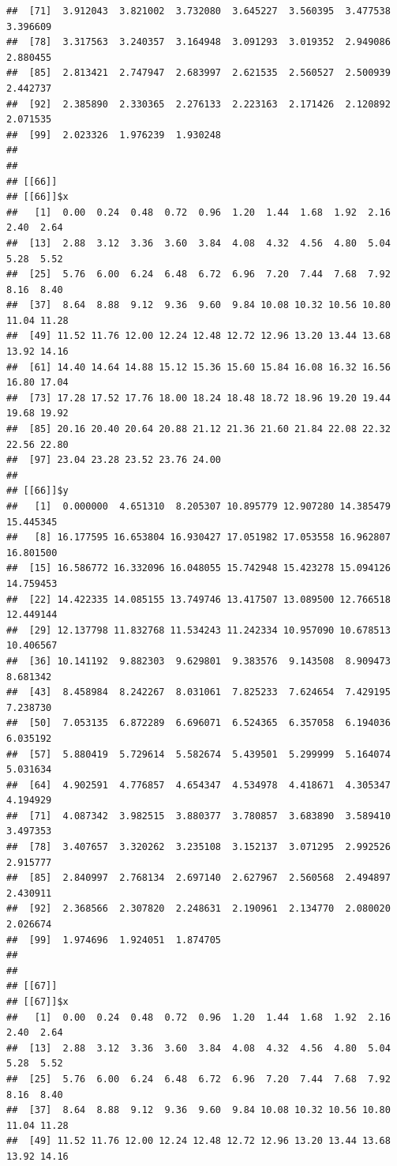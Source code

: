 \documentclass[
  ignorenonframetext,
]{beamer}
\begin{document}
\begin{frame}[fragile]{}
\begin{verbatim}
##  [71]  3.912043  3.821002  3.732080  3.645227  3.560395  3.477538  3.396609
##  [78]  3.317563  3.240357  3.164948  3.091293  3.019352  2.949086  2.880455
##  [85]  2.813421  2.747947  2.683997  2.621535  2.560527  2.500939  2.442737
##  [92]  2.385890  2.330365  2.276133  2.223163  2.171426  2.120892  2.071535
##  [99]  2.023326  1.976239  1.930248
## 
## 
## [[66]]
## [[66]]$x
##   [1]  0.00  0.24  0.48  0.72  0.96  1.20  1.44  1.68  1.92  2.16  2.40  2.64
##  [13]  2.88  3.12  3.36  3.60  3.84  4.08  4.32  4.56  4.80  5.04  5.28  5.52
##  [25]  5.76  6.00  6.24  6.48  6.72  6.96  7.20  7.44  7.68  7.92  8.16  8.40
##  [37]  8.64  8.88  9.12  9.36  9.60  9.84 10.08 10.32 10.56 10.80 11.04 11.28
##  [49] 11.52 11.76 12.00 12.24 12.48 12.72 12.96 13.20 13.44 13.68 13.92 14.16
##  [61] 14.40 14.64 14.88 15.12 15.36 15.60 15.84 16.08 16.32 16.56 16.80 17.04
##  [73] 17.28 17.52 17.76 18.00 18.24 18.48 18.72 18.96 19.20 19.44 19.68 19.92
##  [85] 20.16 20.40 20.64 20.88 21.12 21.36 21.60 21.84 22.08 22.32 22.56 22.80
##  [97] 23.04 23.28 23.52 23.76 24.00
## 
## [[66]]$y
##   [1]  0.000000  4.651310  8.205307 10.895779 12.907280 14.385479 15.445345
##   [8] 16.177595 16.653804 16.930427 17.051982 17.053558 16.962807 16.801500
##  [15] 16.586772 16.332096 16.048055 15.742948 15.423278 15.094126 14.759453
##  [22] 14.422335 14.085155 13.749746 13.417507 13.089500 12.766518 12.449144
##  [29] 12.137798 11.832768 11.534243 11.242334 10.957090 10.678513 10.406567
##  [36] 10.141192  9.882303  9.629801  9.383576  9.143508  8.909473  8.681342
##  [43]  8.458984  8.242267  8.031061  7.825233  7.624654  7.429195  7.238730
##  [50]  7.053135  6.872289  6.696071  6.524365  6.357058  6.194036  6.035192
##  [57]  5.880419  5.729614  5.582674  5.439501  5.299999  5.164074  5.031634
##  [64]  4.902591  4.776857  4.654347  4.534978  4.418671  4.305347  4.194929
##  [71]  4.087342  3.982515  3.880377  3.780857  3.683890  3.589410  3.497353
##  [78]  3.407657  3.320262  3.235108  3.152137  3.071295  2.992526  2.915777
##  [85]  2.840997  2.768134  2.697140  2.627967  2.560568  2.494897  2.430911
##  [92]  2.368566  2.307820  2.248631  2.190961  2.134770  2.080020  2.026674
##  [99]  1.974696  1.924051  1.874705
## 
## 
## [[67]]
## [[67]]$x
##   [1]  0.00  0.24  0.48  0.72  0.96  1.20  1.44  1.68  1.92  2.16  2.40  2.64
##  [13]  2.88  3.12  3.36  3.60  3.84  4.08  4.32  4.56  4.80  5.04  5.28  5.52
##  [25]  5.76  6.00  6.24  6.48  6.72  6.96  7.20  7.44  7.68  7.92  8.16  8.40
##  [37]  8.64  8.88  9.12  9.36  9.60  9.84 10.08 10.32 10.56 10.80 11.04 11.28
##  [49] 11.52 11.76 12.00 12.24 12.48 12.72 12.96 13.20 13.44 13.68 13.92 14.16

\end{verbatim}
\end{frame}
\end{document}

